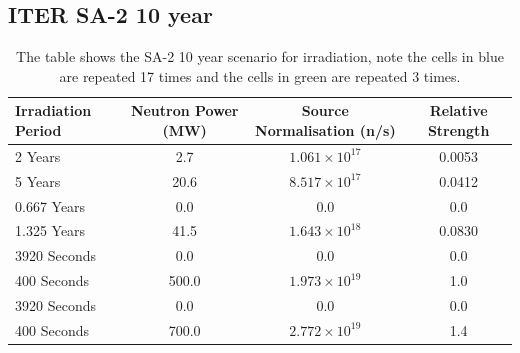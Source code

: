 \documentclass[12pt]{article}
\begin{document}
\subsection{ITER SA-2 10 year}
\begin{table}[ht!]
   \begin{tabular}{| l | c | c | c |}
      \hline 
      Irradiation Period & Neutron Power (MW) & Source Normalisation (n/s) &  Relative Strength \\
      \hline
      2 Years & 2.7 & $1.061\times10^{17}$ & 0.0053 \\
      5 Years & 20.6 & $8.517\times10^{17}$ & 0.0412 \\
      0.667 Years & 0.0 & 0.0 & 0.0 \\
      1.325 Years & 41.5 & $1.643\times10^{18}$ & 0.0830 \\
      \cellcolor{blue!25} 3920 Seconds & \cellcolor{blue!25} 0.0 & \cellcolor{blue!25} 0.0 & \cellcolor{blue!25} 0.0 \\
      \cellcolor{blue!25} \cellcolor{blue!25} 400 Seconds & \cellcolor{blue!25} 500.0 & \cellcolor{blue!25} $1.973\times10^{19}$ & \cellcolor{blue!25} 1.0  \\
      \cellcolor{green!25} 3920 Seconds & \cellcolor{green!25} 0.0 & \cellcolor{green!25} 0.0 &\cellcolor{green!25} 0.0 \\
      \cellcolor{green!25} 400 Seconds & \cellcolor{green!25} 700.0 & \cellcolor{green!25} $2.772\times10^{19}$ &\cellcolor{green!25} 1.4 \\
      \hline
\end{tabular}
\caption{The table shows the SA-2 10 year scenario for irradiation, note the
         cells in \textcolor{blue!25}{blue} are repeated 17 times
         and the cells in \textcolor{green!25}{green} are repeated 3
         times.}
\end{table}
\end{document}
